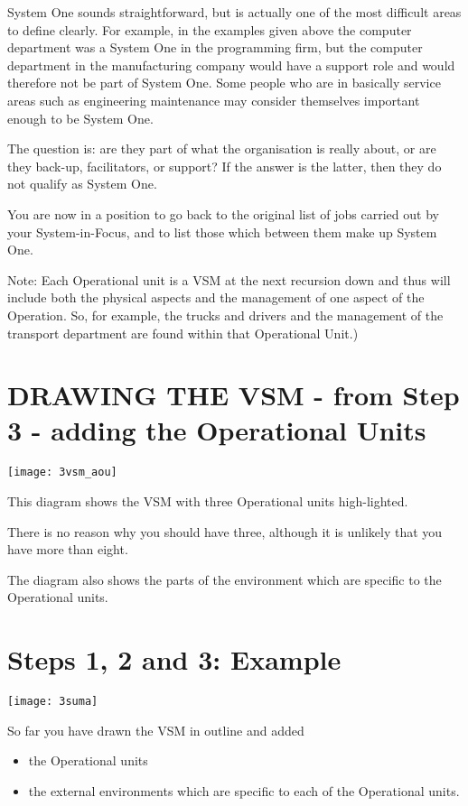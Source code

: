 System One sounds straightforward, but is actually one of the most difficult areas to define clearly. For example, in the examples given above the computer department was a System One in the programming firm, but the computer department in the manufacturing company would have a support role and would therefore not be part of System One. Some people who are in basically service areas such as engineering maintenance may consider themselves important enough to be System One.

The question is: are they part of what the organisation is really about, or are they back-up, facilitators, or support? If the answer is the latter, then they do not qualify as System One.

You are now in a position to go back to the original list of jobs carried out by your System-in-Focus, and to list those which between them make up System One.

Note: Each Operational unit is a VSM at the next recursion down and thus will include both the physical aspects and the management of one aspect of the Operation. So, for example, the trucks and drivers and the management of the transport department are found within that Operational Unit.)

\section*{DRAWING THE VSM - from Step 3 - adding the Operational Units}
\begin{center}
\texttt{[image: 3vsm\_aou]}
\end{center}

This diagram shows the VSM with three Operational units high-lighted.

There is no reason why you should have three, although it is unlikely that you have more than eight.

The diagram also shows the parts of the environment which are specific to the Operational units.


\section*{Steps 1, 2 and 3: Example}
\begin{center}
\texttt{[image: 3suma]}
\end{center}

So far you have drawn the VSM in outline and added

\begin{itemize}
  \item the Operational units

  \item the external environments which are specific to each of the Operational units.

\end{itemize}

